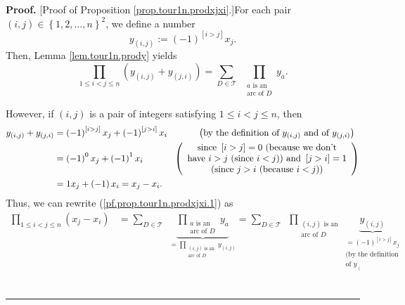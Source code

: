 \documentclass[numbers=enddot,12pt,final,onecolumn,notitlepage]{scrartcl}%
\numberwithin{exer}{subsection}
\theoremstyle{definition}
\newenvironment{proof}[1][Proof]{\noindent\textbf{#1.} }{\ \rule{0.5em}{0.5em}}
\let\sumnonlimits\sum
\let\prodnonlimits\prod
\renewcommand{\sum}{\sumnonlimits\limits}
\renewcommand{\prod}{\prodnonlimits\limits}
\begin{document}
\begin{proof}
[Proof of Proposition \ref{prop.tour1n.prodxjxi}.]For each pair $\left(
i,j\right)  \in\left\{  1,2,\ldots,n\right\}  ^{2}$, we define a number%
\[
y_{\left(  i,j\right)  }:=\left(  -1\right)  ^{\left[  i>j\right]  }x_{j}.
\]
Then, Lemma \ref{lem.tour1n.prody} yields%
\begin{equation}
\prod_{1\leq i<j\leq n}\left(  y_{\left(  i,j\right)  }+y_{\left(  j,i\right)
}\right)  =\sum_{D\in\mathcal{T}}\ \ \prod_{\substack{a\text{ is
an}\\\text{arc of }D}}y_{a}. \label{pf.prop.tour1n.prodxjxi.1}%
\end{equation}


However, if $\left(  i,j\right)  $ is a pair of integers satisfying $1\leq
i<j\leq n$, then
\begin{align*}
y_{\left(  i,j\right)  }+y_{\left(  j,i\right)  }  &  =\left(  -1\right)
^{\left[  i>j\right]  }x_{j}+\left(  -1\right)  ^{\left[  j>i\right]  }%
x_{i}\ \ \ \ \ \ \ \ \ \ \left(  \text{by the definition of }y_{\left(
i,j\right)  }\text{ and of }y_{\left(  j,i\right)  }\right) \\
&  =\left(  -1\right)  ^{0}x_{j}+\left(  -1\right)  ^{1}x_{i}%
\ \ \ \ \ \ \ \ \ \ \left(
\begin{array}
[c]{c}%
\text{since }\left[  i>j\right]  =0\text{ (because we don't}\\
\text{have }i>j\text{ (since }i<j\text{)) and }\left[  j>i\right]  =1\\
\text{(since }j>i\text{ (because }i<j\text{))}%
\end{array}
\right) \\
&  =1x_{j}+\left(  -1\right)  x_{i}=x_{j}-x_{i}.
\end{align*}
Thus, we can rewrite (\ref{pf.prop.tour1n.prodxjxi.1}) as%
\begin{align*}
\prod_{1\leq i<j\leq n}\left(  x_{j}-x_{i}\right)   &  =\sum_{D\in\mathcal{T}%
}\ \ \underbrace{\prod_{\substack{a\text{ is an}\\\text{arc of }D}}y_{a}%
}_{=\prod_{\substack{\left(  i,j\right)  \text{ is an}\\\text{arc of }%
D}}y_{\left(  i,j\right)  }}=\sum_{D\in\mathcal{T}}\ \ \prod
_{\substack{\left(  i,j\right)  \text{ is an}\\\text{arc of }D}%
}\underbrace{y_{\left(  i,j\right)  }}_{\substack{=\left(  -1\right)
^{\left[  i>j\right]  }x_{j}\\\text{(by the definition}\\\text{of }y_{\left(
}}}
\end{align*}
\end{proof}
\end{document}
